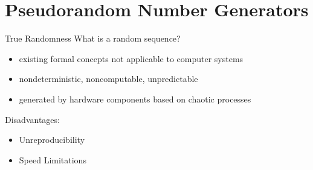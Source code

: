 \documentclass[aspectratio=169]{beamer}
\begin{document}

  \section{Pseudorandom Number Generators} %
  \label{sec:pseudorandom_number_generators}
    \begin{frame}{True Randomness}
      What is a random sequence?
      \pause
      \begin{itemize}
        \item existing formal concepts not applicable to computer systems
        \pause
        \item nondeterministic, noncomputable, unpredictable
        \pause
        \item generated by hardware components based on chaotic processes
      \end{itemize}
      \bigskip
      \pause
      Disadvantages:
      \pause
      \begin{itemize}
        \item Unreproducibility
        \pause
        \item Speed Limitations
      \end{itemize}
    \end{frame}
\end{document}

